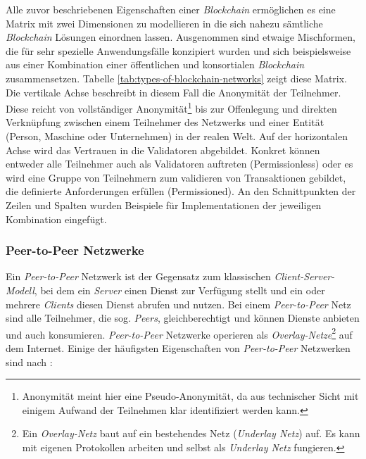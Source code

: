 \noindent
Alle zuvor beschriebenen Eigenschaften einer \textit{Blockchain} ermöglichen es eine Matrix mit zwei Dimensionen zu modellieren in die sich nahezu sämtliche \textit{Blockchain} Lösungen einordnen lassen. Ausgenommen sind etwaige Mischformen, die für sehr spezielle Anwendungsfälle konzipiert wurden und sich beispielsweise aus einer Kombination einer öffentlichen und konsortialen \textit{Blockchain} zusammensetzen. Tabelle \ref{tab:types-of-blockchain-networks} zeigt diese Matrix. Die vertikale Achse beschreibt in diesem Fall die Anonymität der Teilnehmer. Diese reicht von vollständiger Anonymität\footnote{Anonymität meint hier eine Pseudo-Anonymität, da aus technischer Sicht mit einigem Aufwand der Teilnehmen klar identifiziert werden kann.} bis zur Offenlegung und direkten Verknüpfung zwischen einem Teilnehmer des Netzwerks und einer Entität (Person, Maschine oder Unternehmen) in der realen Welt. Auf der horizontalen Achse wird das Vertrauen in die Validatoren abgebildet. Konkret können entweder alle Teilnehmer auch als Validatoren auftreten (Permissionless) oder es wird eine Gruppe von Teilnehmern zum validieren von Transaktionen gebildet, die definierte Anforderungen erfüllen (Permissioned). An den Schnittpunkten der Zeilen und Spalten wurden Beispiele für Implementationen der jeweiligen Kombination eingefügt.


\subsubsection{Peer-to-Peer Netzwerke}
Ein \textit{Peer-to-Peer} Netzwerk ist der Gegensatz zum klassischen \textit{Client-Server-Modell}, bei dem ein \textit{Server} einen Dienst zur Verfügung stellt und ein oder mehrere \textit{Clients} diesen Dienst abrufen und nutzen. Bei einem \textit{Peer-to-Peer} Netz sind alle Teilnehmer, die sog. \textit{Peers}, gleichberechtigt und können Dienste anbieten und auch konsumieren. \textit{Peer-to-Peer} Netzwerke operieren als \textit{Overlay-Netze}\footnote{Ein \textit{Overlay-Netz} baut auf ein bestehendes Netz (\textit{Underlay Netz}) auf. Es kann mit eigenen Protokollen arbeiten und selbst als \textit{Underlay Netz} fungieren.\citep{Andersen2001}} auf dem Internet. Einige der häufigsten Eigenschaften von \textit{Peer-to-Peer} Netzwerken sind nach \citet{Steinmetz2005}:

